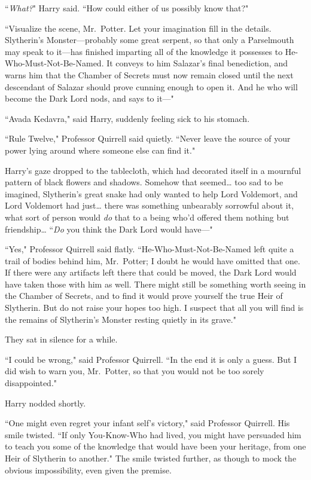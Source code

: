 ``\emph{What?}" Harry said. ``How could either of us possibly know that?"

``Visualize the scene, Mr.~Potter. Let your imagination fill in the details. Slytherin's Monster—probably some great serpent, so that only a Parselmouth may speak to it—has finished imparting all of the knowledge it possesses to He-Who-Must-Not-Be-Named. It conveys to him Salazar's final benediction, and warns him that the Chamber of Secrets must now remain closed until the next descendant of Salazar should prove cunning enough to open it. And he who will become the Dark Lord nods, and says to it—"

``Avada Kedavra," said Harry, suddenly feeling sick to his stomach.

``Rule Twelve," Professor Quirrell said quietly. ``Never leave the source of your power lying around where someone else can find it."

Harry's gaze dropped to the tablecloth, which had decorated itself in a mournful pattern of black flowers and shadows. Somehow that seemed{\ldots} too sad to be imagined, Slytherin's great snake had only wanted to help Lord Voldemort, and Lord Voldemort had just{\ldots} there was something unbearably sorrowful about it, what sort of person would \emph{do} that to a being who'd offered them nothing but friendship{\ldots} ``\emph{Do} you think the Dark Lord would have—"

``Yes," Professor Quirrell said flatly. ``He-Who-Must-Not-Be-Named left quite a trail of bodies behind him, Mr.~Potter; I doubt he would have omitted that one. If there were any artifacts left there that could be moved, the Dark Lord would have taken those with him as well. There might still be something worth seeing in the Chamber of Secrets, and to find it would prove yourself the true Heir of Slytherin. But do not raise your hopes too high. I suspect that all you will find is the remains of Slytherin's Monster resting quietly in its grave."

They sat in silence for a while.

``I could be wrong," said Professor Quirrell. ``In the end it is only a guess. But I did wish to warn you, Mr.~Potter, so that you would not be too sorely disappointed."

Harry nodded shortly.

``One might even regret your infant self's victory," said Professor Quirrell. His smile twisted. ``If only You-Know-Who had lived, you might have persuaded him to teach you some of the knowledge that would have been your heritage, from one Heir of Slytherin to another." The smile twisted further, as though to mock the obvious impossibility, even given the premise.

